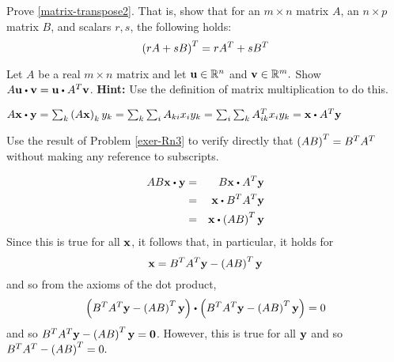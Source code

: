 \begin{enumialphparenastyle}
\begin{ex} Prove \ref{matrix-transpose2}. That is, show that for an $m \times n$ matrix $A$, an $n \times p$ matrix $B$, and scalars $r, s$, the following holds:
\[
\left(rA + sB \right) ^T = rA^{T} + sB^{T}
\]
\end{ex}

\begin{ex} \label{exer-Rn3}  Let $A$ be a real $m\times n$ matrix and
let $\mbox{\bf u}\in \mathbb{R}^{n}$ and $\mbox{\bf v}\in \mathbb{R}^{m}.$ Show 
$A\vect{u}\dotprod \vect{v}=\vect{u}\dotprod A^{T}\vect{v}$. 
\textbf{Hint:} Use the definition of matrix
multiplication to do this.
\begin{sol}
$A\vect{x}\dotprod \vect{y}=\sum_{k}\tup{A\vect{x}
} _{k}y_{k}=\sum_{k}\sum_{i}A_{ki}x_{i}y_{k}=\sum_{i}
\sum_{k}A_{ik}^{T}x_{i}y_{k}= \vect{x} \dotprod A^{T}\vect{y} $
\end{sol}
\end{ex}

\begin{ex} Use the result of Problem \ref{exer-Rn3} to verify directly
that $\left(AB\right) ^{T}=B^{T}A^{T}$ without making any reference to
subscripts.
\begin{sol}
\begin{eqnarray*}
 AB\vect{x} \dotprod \vect{y} &=& B\vect{x} \dotprod A^{T}\vect{y} \\ 
&=& \vect{x}\dotprod B^{T}A^{T}\vect{y} \\
&=& \vect{x}\dotprod \tup{AB} ^{T} \vect{y}
\end{eqnarray*}
Since this is true for all $\mbox{\bf x}$, it follows that, in particular, it
holds for
\[
\mbox{\bf x}=B^{T}A^{T}\mbox{\bf y}-\left(AB\right) ^{T}\mbox{\bf y}
\]
and so from the axioms of the dot product,
\[
\tup{B^{T}A^{T}\vect{y}-\tup{AB} ^{T}\vect{y}} \dotprod \tup{B^{T}A^{T}
\vect{y}-\tup{AB} ^{T}\vect{y}} =0
\]
and so $B^{T}A^{T}\mbox{\bf y}-\left(AB\right) ^{T}\mbox{\bf y}=\mbox{\bf 0}$. However,
this is true for all $\mbox{\bf y}$ and so $B^{T}A^{T}-\left(
AB\right) ^{T}=0.$
\end{sol}
\end{ex}
 
\end{enumialphparenastyle}